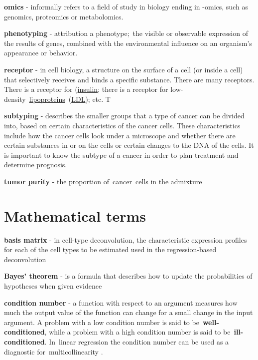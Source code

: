\documentclass[12pt,]{book}
\theoremstyle{definition}
\theoremstyle{definition}
\theoremstyle{definition}
\theoremstyle{remark}
\begin{document}
\textbf{omics} - informally refers to a field of study in biology ending
in -omics, such as genomics, proteomics or metabolomics. \citep{omics}

\textbf{phenotyping} - attribution a phenotype;~the visible or
observable expression of the results of genes, combined with the
environmental influence on an organism's appearance or
behavior.~\citep{pheno}

\textbf{receptor} - in cell biology, a structure on the surface of a
cell (or inside a cell) that selectively receives and binds a specific
substance. There are many receptors. There is a receptor for
(\href{https://www.medicinenet.com/script/main/art.asp?articlekey=3989}{insulin};
there is a receptor for
low-density~\href{https://www.medicinenet.com/script/main/art.asp?articlekey=15389}{lipoproteins}~(\href{https://www.medicinenet.com/script/main/art.asp?articlekey=6232}{LDL});
etc. T \citep{receptor}

\textbf{subtyping} - describes the smaller groups that a type of cancer
can be divided into, based on certain characteristics of the cancer
cells. These characteristics include how the cancer cells look under a
microscope and whether there are certain substances in or on the cells
or certain changes to the DNA of the cells. It is important to know the
subtype of a cancer in order to plan treatment and determine prognosis.
\citep{cansub}

\textbf{tumor purity} - the proportion of~cancer~cells in the admixture
\citep{Aran2015}

\newpage

\hypertarget{mathematical-terms}{%
\section*{Mathematical terms}\label{mathematical-terms}}

\textbf{basis matrix} - in cell-type deconvolution, the characteristic
expression profiles for each of the cell types to be estimated used in
the regression-based deconvolution

\textbf{Bayes' theorem} - is a formula that describes how to update the
probabilities of hypotheses when given evidence \citep{bayes}

\textbf{condition number} - a function with respect to an argument
measures how much the output value of the function can change for a
small change in the input argument. A problem with a low condition
number is said to be~\textbf{well-conditioned}, while a problem with a
high condition number is said to be~\textbf{ill-conditioned}. In~linear
regression the condition number can be used as a diagnostic
for~multicollinearity \citep{Belsley1980}.
\end{document}
